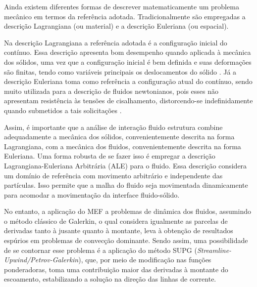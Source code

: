Ainda existem diferentes formas de descrever matematicamente um problema mecânico em termos da referência adotada. Tradicionalmente são empregadas a descrição Lagrangiana (ou material) e a descrição Euleriana (ou espacial).

Na descrição Lagrangiana a referência adotada é a configuração inicial do contínuo. Essa descrição apresenta bom desempenho quando aplicada à mecânica dos sólidos, uma vez que a configuração inicial é bem definida e suas deformações são finitas, tendo como variáveis principais os deslocamentos do sólido \cite{sanches2014fluid, fernandes2019ale}. Já a descrição Euleriana toma como referência a configuração atual do contínuo, sendo muito utilizada para a descrição de fluidos newtonianos, pois esses não apresentam resistência às tensões de cisalhamento, distorcendo-se indefinidamente quando submetidos a tais solicitações \cite{sanches2014fluid, fernandes2019ale}.

Assim, é importante que a análise de interação fluido estrutura combine adequadamente a mecânica dos sólidos, convenientemente descrita na forma Lagrangiana, com a mecânica dos fluidos, convenientemente descrita na forma Euleriana. Uma forma robusta de se fazer isso é empregar a descrição Lagrangiana-Euleriana Arbitrária (ALE)  \cite{donea1982arbitrary} para o fluido. Essa descrição considera um domínio de referência com movimento arbitrário e independente das partículas. Isso permite que a malha do fluido seja movimentada dinamicamente para acomodar a movimentação da interface fluido-sólido.

No entanto, a aplicação do MEF a problemas de dinâmica dos fluidos, assumindo o método clássico de Galerkin, o qual considera igualmente as parcelas de derivadas tanto à jusante quanto à montante, leva à obtenção de resultados espúrios em problemas de convecção dominante. Sendo assim, uma possibilidade de se contornar esse problema é a aplicação do método SUPG (\textit{Streamline-Upwind/Petrov-Galerkin}), que, por meio de modificação nas funções ponderadoras, toma uma contribuição maior das derivadas à montante do escoamento, estabilizando a solução na direção das linhas de corrente.


